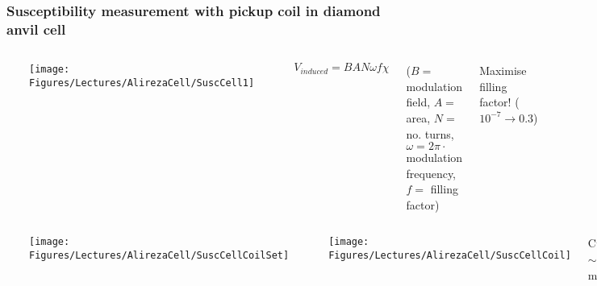 \begin{frame}[label=DACSuscept]
\frametitle{Susceptibility measurement with pickup coil in diamond anvil cell}
\begin{columns}[t]

\centerline{~}
\centerline{\texttt{[image: \\Figures/Lectures/AlirezaCell/SuscCell1]}}

\centerline{~}
$V_{induced} = B A N \omega f \chi$
\encbox
\begin{center}
{\scriptsize ($B= $ modulation field, $A =$ area, $N =$ no. turns, \\$\omega = 2\pi\cdot$ modulation frequency, $f =$ filling factor)}
\end{center}

\centerline{Maximise filling factor! ($10^{-7} \rightarrow 0.3$)}
\end{columns}

\begin{columns}[t]
\centerline{~}
\centerline{\texttt{[image: \\Figures/Lectures/AlirezaCell/SuscCellCoilSet]}}

\centerline{~}
\centerline{\texttt{[image: \\Figures/Lectures/AlirezaCell/SuscCellCoil]}}


\bi
\item Culet $\sim$ 1 mm.
\item Modulation coil (1), pickup-coil pair (2), compensation coil (3).
\item Al$_2$O$_3$-insulated metal gasket.
\ei

{\scriptsize [Alireza, Rev. Sci. Inst. {\bf 74} (2003) 4728]} 

\end{columns}

\end{frame}

